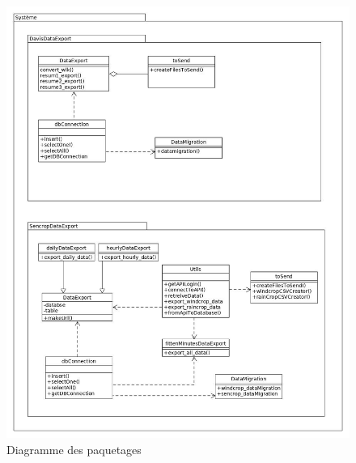 \begin{figure}[!h]
    \centering
    \includegraphics[height=.8\textheight]{images/package_diagramme.jpg}
    \caption{Diagramme des paquetages}
    \label{fig:Diagramme des paquetages}
\end{figure}
     

